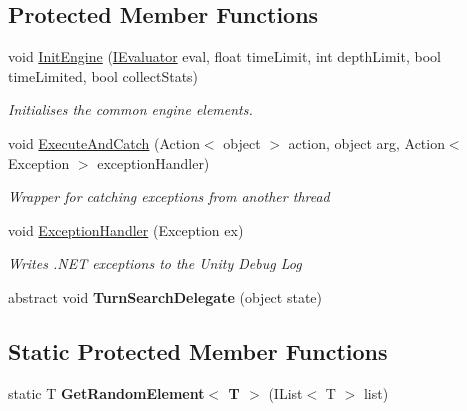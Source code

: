 \subsection*{Protected Member Functions}
\begin{DoxyCompactItemize}
\item 
void \hyperlink{class_universal_turn_based_a_i_1_1_turn_engine_aeb42263a4aff0a25e124654af9a9286b}{Init\+Engine} (\hyperlink{interface_universal_turn_based_a_i_1_1_i_evaluator}{I\+Evaluator} eval, float time\+Limit, int depth\+Limit, bool time\+Limited, bool collect\+Stats)
\begin{DoxyCompactList}\small\item\em Initialises the common engine elements. \end{DoxyCompactList}\item 
void \hyperlink{class_universal_turn_based_a_i_1_1_turn_engine_a7b14c450da986c60ebab0d992081371c}{Execute\+And\+Catch} (Action$<$ object $>$ action, object arg, Action$<$ Exception $>$ exception\+Handler)
\begin{DoxyCompactList}\small\item\em Wrapper for catching exceptions from another thread \end{DoxyCompactList}\item 
void \hyperlink{class_universal_turn_based_a_i_1_1_turn_engine_a1d1d7061052986196974028919d5c45f}{Exception\+Handler} (Exception ex)
\begin{DoxyCompactList}\small\item\em Writes .N\+E\+T exceptions to the Unity Debug Log \end{DoxyCompactList}\item 
\hypertarget{class_universal_turn_based_a_i_1_1_turn_engine_af34e85df941ad5c3cb3b1af7260752fe}{}abstract void {\bfseries Turn\+Search\+Delegate} (object state)\label{class_universal_turn_based_a_i_1_1_turn_engine_af34e85df941ad5c3cb3b1af7260752fe}

\end{DoxyCompactItemize}
\subsection*{Static Protected Member Functions}
\begin{DoxyCompactItemize}
\item 
\hypertarget{class_universal_turn_based_a_i_1_1_turn_engine_a2f0108600a38970fa4f8d46ac5919e3d}{}static T {\bfseries Get\+Random\+Element$<$ T $>$} (I\+List$<$ T $>$ list)\label{class_universal_turn_based_a_i_1_1_turn_engine_a2f0108600a38970fa4f8d46ac5919e3d}

\end{DoxyCompactItemize}
